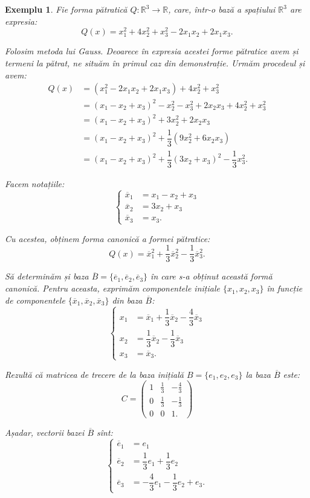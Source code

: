 \documentclass[11pt,a4paper]{article}
\theoremstyle{dotless}
\theoremstyle{dotlessdr}
\newtheorem{example}{Exemplu}[section]
\begin{document}
\begin{example}
	Fie forma pătratică $Q : \mathbb{R}^3 \to \mathbb{R}$, care, într-o bază
a spațiului $\mathbb{R}^3$ are expresia: 
 \[
	Q(x) = x_1^2 + 4x_2^2 + x_3^2 - 2x_1 x_2 + 2x_1 x_3.
\]

Folosim metoda lui Gauss. Deoarece în expresia acestei forme pătratice avem și
termeni la pătrat, ne situăm în primul caz din demonstrație. Urmăm procedeul
și avem:
\begin{align*}
Q(x) &= (x_1^2 - 2x_1 x_2 + 2x_1 x_3) + 4x_2^2 + x_3^2 \\
     &= (x_1 - x_2 + x_3)^2 - x_2^2 - x_3^2 + 2x_2 x_3 + 4x_2^2 + x_3^2 \\
     &= (x_1 - x_2 + x_3)^2 + 3x_2^2 + 2x_2 x_3 \\
     &= (x_1 - x_2 + x_3)^2 + \dfrac{1}{3} (9x_2^2 + 6x_2 x_3) \\
     &= (x_1 - x_2 + x_3)^2 + \dfrac{1}{3} (3x_2 + x_3)^2 - \dfrac{1}{3} x_3^2.
\end{align*}

Facem notațiile: 
 \[
	\begin{cases}	
	    \overline{x}_1 &= x_1 - x_2 + x_3 \\
	    \overline{x}_2 &= 3x_2 + x_3 \\
	    \overline{x}_3 &= x_3.
    \end{cases}
\]

Cu acestea, obținem forma canonică a formei pătratice: 
 \[
	Q(x) = \overline{x}_1^2 + \dfrac{1}{3} \overline{x}_2^2 - \dfrac{1}{3}
	        \overline{x}_3^2.
\]

Să determinăm și baza $\overline{B} = \{\overline{e}_1, \overline{e}_2,
\overline{e}_3\}$ în care s-a obținut această formă canonică. Pentru aceasta,
exprimăm componentele inițiale $\{x_1, x_2, x_3\}$ în funcție de componentele
$\{\overline{x}_1, \overline{x}_2, \overline{x}_3\}$ din baza $\overline{B}$: 
 \[
	\begin{cases}	
	    x_1 &= \overline{x}_1 + \dfrac{1}{3} \overline{x}_2 - \dfrac{4}{3}
	            \overline{x}_3 \\
	    x_2 &= \dfrac{1}{3} \overline{x}_2 - \dfrac{1}{3} \overline{x}_3 \\
	    x_3 &= \overline{x}_3.
    \end{cases}
\]

Rezultă că matricea de trecere de la baza inițială $B = \{e_1, e_2, e_3\}$ la
baza $\overline{B}$ este: 
 \[
	C = \begin{pmatrix}
	        1 & \frac{1}{3} & -\frac{4}{3} \\
	        0 & \frac{1}{3} & -\frac{1}{3} \\
	        0 & 0 & 1.
        \end{pmatrix}
\]

Așadar, vectorii bazei $\overline{B}$ sînt: 
 \[
	\begin{cases}	
	    \overline{e}_1 &= e_1 \\
	    \overline{e}_2 &= \dfrac{1}{3} e_1 + \dfrac{1}{3} e_2 \\
	    \overline{e}_3 &= -\dfrac{4}{3} e_1 - \dfrac{1}{3} e_2 + e_3.
    \end{cases}
\]
\end{example}
\end{document}
